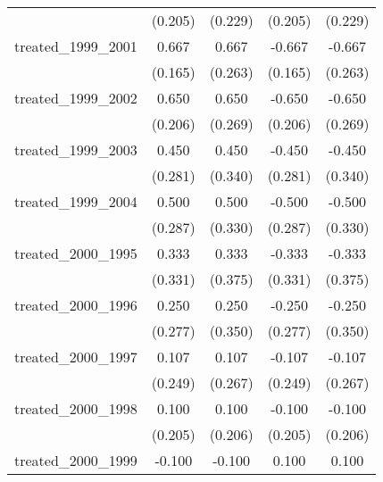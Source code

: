 {\begin{tabular}{l*{4}{c}}
            &     (0.205)         &     (0.229)         &     (0.205)         &     (0.229)         \\
[1em]
treated\_1999\_2001&       0.667\sym{***}&       0.667\sym{*}  &      -0.667\sym{***}&      -0.667\sym{*}  \\
            &     (0.165)         &     (0.263)         &     (0.165)         &     (0.263)         \\
[1em]
treated\_1999\_2002&       0.650\sym{**} &       0.650\sym{*}  &      -0.650\sym{**} &      -0.650\sym{*}  \\
            &     (0.206)         &     (0.269)         &     (0.206)         &     (0.269)         \\
[1em]
treated\_1999\_2003&       0.450         &       0.450         &      -0.450         &      -0.450         \\
            &     (0.281)         &     (0.340)         &     (0.281)         &     (0.340)         \\
[1em]
treated\_1999\_2004&       0.500         &       0.500         &      -0.500         &      -0.500         \\
            &     (0.287)         &     (0.330)         &     (0.287)         &     (0.330)         \\
[1em]
treated\_2000\_1995&       0.333         &       0.333         &      -0.333         &      -0.333         \\
            &     (0.331)         &     (0.375)         &     (0.331)         &     (0.375)         \\
[1em]
treated\_2000\_1996&       0.250         &       0.250         &      -0.250         &      -0.250         \\
            &     (0.277)         &     (0.350)         &     (0.277)         &     (0.350)         \\
[1em]
treated\_2000\_1997&       0.107         &       0.107         &      -0.107         &      -0.107         \\
            &     (0.249)         &     (0.267)         &     (0.249)         &     (0.267)         \\
[1em]
treated\_2000\_1998&       0.100         &       0.100         &      -0.100         &      -0.100         \\
            &     (0.205)         &     (0.206)         &     (0.205)         &     (0.206)         \\
[1em]
treated\_2000\_1999&      -0.100         &      -0.100         &       0.100         &       0.100         \\

\end{tabular}}
